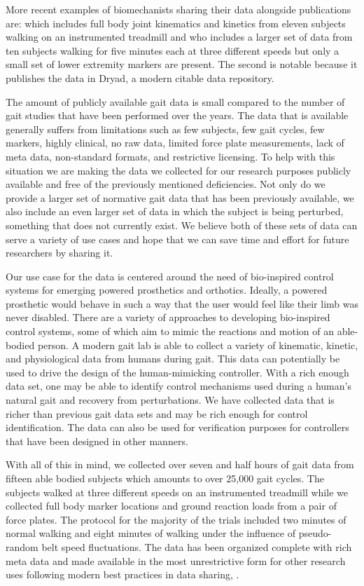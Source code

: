 \documentclass[fleqn,12pt]{wlpeerj}
\begin{document}
More recent examples of biomechanists sharing their data alongside publications
are: \cite{Bogert2013} which includes full body joint kinematics and kinetics
from eleven subjects walking on an instrumented treadmill and \cite{Wang2014}
who includes a larger set of data from ten subjects walking for five minutes
each at three different speeds but only a small set of lower extremity markers
are present. The second is notable because it publishes the data in Dryad, a
modern citable data repository.

The amount of publicly available gait data is small compared to the number of
gait studies that have been performed over the years. The data that is
available generally suffers from limitations such as few subjects, few gait
cycles, few markers, highly clinical, no raw data, limited force plate
measurements, lack of meta data, non-standard formats, and restrictive
licensing. To help with this situation we are making the data we collected for
our research purposes publicly available and free of the previously mentioned
deficiencies. Not only do we provide a larger set of normative gait data that
has been previously available, we also include an even larger set of data in
which the subject is being perturbed, something that does not currently exist.
We believe both of these sets of data can serve a variety of use cases and hope
that we can save time and effort for future researchers by sharing it.

Our use case for the data is centered around the need of bio-inspired control
systems for emerging powered prosthetics and orthotics. Ideally, a powered
prosthetic would behave in such a way that the user would feel like their limb
was never disabled. There are a variety of approaches to developing
bio-inspired control systems, some of which aim to mimic the reactions and
motion of an able-bodied person. A modern gait lab is able to collect a variety
of kinematic, kinetic, and physiological data from humans during gait. This
data can potentially be used to drive the design of the human-mimicking
controller. With a rich enough data set, one may be able to identify control
mechanisms used during a human's natural gait and recovery from perturbations.
We have collected data that is richer than previous gait data sets and may be
rich enough for control identification. The data can also be used for
verification purposes for controllers that have been designed in other manners.

With all of this in mind, we collected over seven and half hours of gait data
from fifteen able bodied subjects which amounts to over 25,000 gait cycles. The
subjects walked at three different speeds on an instrumented treadmill while we
collected full body marker locations and ground reaction loads from a pair of
force plates. The protocol for the majority of the trials included two minutes
of normal walking and eight minutes of walking under the influence of
pseudo-random belt speed fluctuations. The data has been organized complete
with rich meta data and made available in the most unrestrictive form for other
research uses following modern best practices in data sharing, \cite{White2013}.
\end{document}

